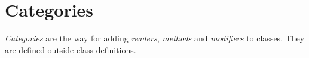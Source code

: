 
\chapter{Categories}

\emph{Categories} are the way for adding \emph{readers}, \emph{methods} and \emph{modifiers} to classes. They are defined outside class definitions.